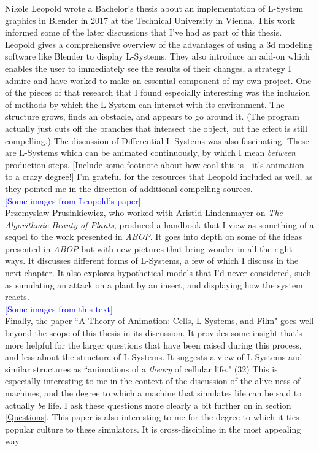 \documentclass[12pt,twoside]{reedthesis}
\begin{document}
	Nikole Leopold wrote a Bachelor's thesis about an implementation of L-System graphics in Blender in 2017 at the Technical University in Vienna. This work informed some of the later discussions that I've had as part of this thesis. Leopold gives a comprehensive overview of the advantages of using a 3d modeling software like Blender to display L-Systems. They also introduce an add-on which enables the user to immediately see the results of their changes, a strategy I admire and have worked to make an essential component of my own project. One of the pieces of that research that I found especially interesting was the inclusion of methods by which the L-System can interact with its environment. The structure grows, finds an obstacle, and appears to go around it. (The program actually just cuts off the branches that intersect the object, but the effect is still compelling.) The discussion of Differential L-Systems was also fascinating. These are L-Systems which can be animated continuously, by which I mean \textit{between} production steps. [Include some footnote about how cool this is - it's animation to a crazy degree!] I'm grateful for the resources that Leopold included as well, as they pointed me in the direction of additional compelling sources.\\
	
	\textcolor{blue}{[Some images from Leopold's paper]}\\
	
	Przemyslaw Prusinkiewicz, who worked with Aristid Lindenmayer on \textit{The Algorithmic Beauty of Plants}, produced a handbook that I view as something of a sequel to the work presented in \textit{ABOP}. It goes into depth on some of the ideas presented in \textit{ABOP} but with new pictures that bring wonder in all the right ways. It discusses different forms of L-Systems, a few of which I discuss in the next chapter. It also explores hypothetical models that I'd never considered, such as simulating an attack on a plant by an insect, and displaying how the system reacts.\\
	
	\textcolor{blue}{[Some images from this text]}\\
	
	Finally, the paper ``A Theory of Animation: Cells, L-Systems, and Film" goes well beyond the scope of this thesis in its discussion. It provides some insight that's more helpful for the larger questions that have been raised during this process, and less about the structure of L-Systems. It suggests a view of L-Systems and similar structures as ``animations of a \textit{theory} of cellular life." (32) This is especially interesting to me in the context of the discussion of the alive-ness of machines, and the degree to which a machine that simulates life can be said to actually \textit{be} life. I ask these questions more clearly a bit further on in section \ref{Questions}. This paper is also interesting to me for the degree to which it ties popular culture to these simulators. It is cross-discipline in the most appealing way.\\
	
\end{document}
